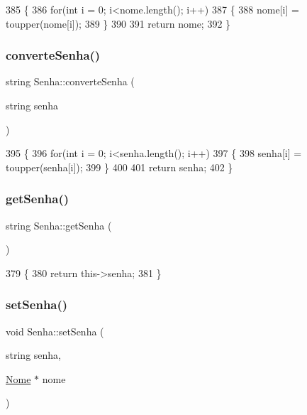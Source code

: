 \begin{DoxyCode}
385 \{
386  \textcolor{keywordflow}{for}(\textcolor{keywordtype}{int} i = 0; i<nome.length(); i++)
387  \{
388    nome[i] = toupper(nome[i]);
389  \}
390 
391  \textcolor{keywordflow}{return} nome;
392 \}
\end{DoxyCode}
\mbox{\label{class_senha_a64d982211a22299b77487531bdc18e1f}} 
\subsubsection{\texorpdfstring{converte\+Senha()}{converteSenha()}}
{\footnotesize\ttfamily string Senha\+::converte\+Senha (\begin{DoxyParamCaption}\item[{string}]{senha }\end{DoxyParamCaption})}


\begin{DoxyCode}
395 \{
396  \textcolor{keywordflow}{for}(\textcolor{keywordtype}{int} i = 0; i<senha.length(); i++)
397  \{
398    senha[i] = toupper(senha[i]);
399  \}
400 
401  \textcolor{keywordflow}{return} senha;
402 \}
\end{DoxyCode}
\mbox{\label{class_senha_a8786b3d03b1652e73df1cdce46cbbaaf}} 
\subsubsection{\texorpdfstring{get\+Senha()}{getSenha()}}
{\footnotesize\ttfamily string Senha\+::get\+Senha (\begin{DoxyParamCaption}{ }\end{DoxyParamCaption})}


\begin{DoxyCode}
379 \{
380   \textcolor{keywordflow}{return} this->senha;
381 \}
\end{DoxyCode}
\mbox{\label{class_senha_a01bbc2a82c5f405b68f33fe0dc538ec1}} 
\subsubsection{\texorpdfstring{set\+Senha()}{setSenha()}}
{\footnotesize\ttfamily void Senha\+::set\+Senha (\begin{DoxyParamCaption}\item[{string}]{senha,  }\item[{\mbox{\hyperlink{class_nome}{Nome}} $\ast$}]{nome }\end{DoxyParamCaption})}



